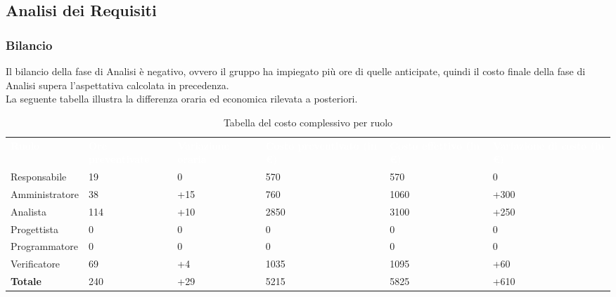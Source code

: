 \subsection{Analisi dei Requisiti}
\subsubsection{Bilancio}
Il bilancio della fase di Analisi è negativo, ovvero il gruppo ha impiegato più ore di quelle anticipate, quindi il costo finale della fase di Analisi supera l'aspettativa calcolata in precedenza.\\
La seguente tabella illustra la differenza oraria ed economica rilevata a posteriori.

{
\renewcommand{\arraystretch}{2}
\begin{longtable}[h]{ C{2.5cm} C{2.5cm} C{2.5cm} C{2.5cm} C{1.5cm} C{2.5cm}}
\caption{Tabella del costo complessivo per ruolo}\\

\textcolor{white}{\textbf{Ruolo}} & 
\textcolor{white}{\textbf{Ore preventivate}} & 
\textcolor{white}{\textbf{Variazione oraria}} & 
\textcolor{white}{\textbf{Costo preventivato (in \euro{})}} & 
\textcolor{white}{\textbf{Costo effettivo (in \euro{})}} & 
\textcolor{white}{\textbf{Variazione di costo (in \euro{})}}\\	
	
Responsabile    &  19 &   0 &  570 &  570 &    0 \\
Amministratore  &  38 & +15 &  760 & 1060 & +300 \\
Analista        & 114 & +10 & 2850 & 3100 & +250 \\
Progettista     &   0 &   0 &    0 &    0 &    0 \\
Programmatore   &   0 &   0 &    0 &    0 &    0 \\
Verificatore    &  69 &  +4 & 1035 & 1095 &  +60 \\
\textbf{Totale} & 240 & +29 & 5215 & 5825 & +610 \\	

\end{longtable}
}

